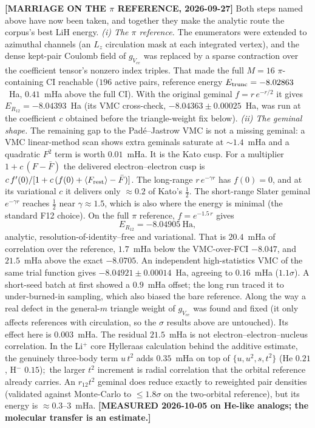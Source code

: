 \documentclass[aps,pra,twocolumn,superscriptaddress,longbibliography]{revtex4-2}
\begin{document}
\textbf{[MARRIAGE ON THE $\pi$ REFERENCE, 2026-09-27]}  Both steps named above
have now been taken, and together they make the analytic route the corpus's best
LiH energy.  \emph{(i) The $\pi$ reference.}  The enumerators were extended to
azimuthal channels (an $L_z$ circulation mask at each integrated vertex), and the
dense kept-pair Coulomb field of $g_{V_{ee}}$ was replaced by a sparse
contraction over the coefficient tensor's nonzero index triples.  That made the
full $M=16$ $\pi$-containing CI reachable ($196$ active pairs, reference energy
$E_{\rm trunc}=-8.02863$~Ha, $0.41$~mHa above the full CI).  With the original
geminal $f=r\,e^{-r/2}$ it gives $E_{R_{12}}=-8.04393$~Ha (its VMC cross-check,
$-8.04363\pm0.00025$~Ha, was run at the coefficient $c$ obtained before the
triangle-weight fix below).  \emph{(ii) The geminal shape.}  The
remaining gap to the Pad\'e--Jastrow VMC is not a missing geminal: a VMC
linear-method scan shows extra geminals saturate at $\sim1.4$~mHa and a
quadratic $F^2$ term is worth $0.01$~mHa.  It is the Kato cusp.  For a
multiplier $1+c\,(F-\bar F)$ the delivered electron--electron cusp is
$c\,f'(0)/[1+c\,(f(0)+\langle F_{\rm rest}\rangle-\bar F)]$.  The long-range
$r\,e^{-\gamma r}$ has $f(0)=0$, and at its variational $c$ it delivers only
$\approx0.2$ of Kato's $\tfrac12$.  The short-range Slater geminal $e^{-\gamma r}$
reaches $\tfrac12$ near $\gamma\approx1.5$, which is also where the energy is
minimal (the standard F12 choice).  On the full $\pi$ reference,
$f=e^{-1.5\,r}$ gives
\[
E_{R_{12}} = \mathbf{-8.04905}~\mathrm{Ha},
\]
analytic, resolution-of-identity--free and variational.  That is $20.4$~mHa of
correlation over the reference, $1.7$~mHa below the VMC-over-FCI $-8.047$, and
$21.5$~mHa above the exact $-8.0705$.  An independent high-statistics VMC of the
same trial function gives $-8.04921\pm0.00014$~Ha, agreeing to $0.16$~mHa
($1.1\sigma$).  A short-seed batch at first showed a $0.9$~mHa offset; the
long run traced it to under-burned-in sampling, which also biased the bare
reference.  Along the way a real defect in the general-$m$ triangle weight of
$g_{V_{ee}}$ was found and fixed (it only affects references with circulation,
so the $\sigma$ results above are untouched).  Its effect here is $0.003$~mHa.
The residual $21.5$~mHa is not electron--electron--nucleus correlation.
In the Li$^+$ core Hylleraas calculation behind the additive estimate, the
genuinely three-body term $u\,t^2$ adds $0.35$~mHa on top of
$\{u,u^2,s,t^2\}$ (He $0.21$, H$^-$ $0.15$);\ the larger $t^2$ increment is
radial correlation that the orbital reference already carries.  An $r_{12}t^2$
geminal does reduce exactly to reweighted pair densities (validated against
Monte-Carlo to $\le1.8\sigma$ on the two-orbital reference), but its energy is
$\approx0.3$--$3$~mHa.  \textbf{[MEASURED 2026-10-05 on He-like analogs; the
molecular transfer is an estimate.]}
\end{document}

